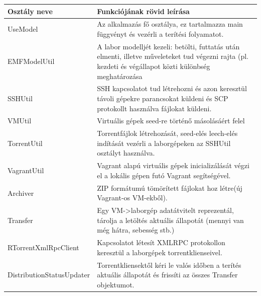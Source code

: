 \begin{center}
	\begin{tabular}{|>{\centering\arraybackslash}m{45mm}|>{\centering\arraybackslash}m{95mm}|}
		\hline
		\textbf{Osztály neve}&\textbf{Funkciójának rövid leírása}\\
		\hline
		\cellcolor{skyblue}UseModel & \cellcolor{skyblue}Az alkalmazás fő osztálya, ez tartalmazza main függvényt és vezérli a terítési folyamatot.\\ 
		\hline
		\cellcolor{skyblue}EMFModelUtil & \cellcolor{skyblue}A labor modelljét kezeli: betölti, futtatás után elmenti, illetve műveleteket tud végezni rajta (pl. kezdeti és végállapot közti különbség meghatározása\\
		\hline
		\cellcolor{seagreen}SSHUtil & \cellcolor{seagreen}SSH kapcsolatot tud létrehozni és azon keresztül távoli gépekre parancsokat küldeni és SCP protokollt használva fájlokat küldeni.\\
		\hline
		\cellcolor{orange}VMUtil & \cellcolor{orange} Virtuális gépek seed-re történő másolásáért felel\\
		\hline
		\cellcolor{orange}TorrentUtil &\cellcolor{orange}Torrentfájlok létrehozását, seed-elés leech-elés indítását vezérli a laborgépeken az SSHUtil osztályt használva. \\
		\hline
		\cellcolor{orange}VagrantUtil &\cellcolor{orange} Vagrant alapú virtuális gépek inicializálását végzi el a lokális gépen futó Vagrant segítségével.\\
		\hline
		\cellcolor{orange}Archiver &\cellcolor{orange} ZIP formátumú tömörített fájlokat hoz létre(új Vagrant-os VM-ekből).\\
		\hline
		\cellcolor{lightred}Transfer &\cellcolor{lightred} Egy VM->laborgép adatátvitelt reprezentál, tárolja a letöltés aktuális állapotát (mennyi van még hátra, sebesség stb.)\\
		\hline
		\cellcolor{lightred}RTorrentXmlRpcClient &\cellcolor{lightred} Kapcsolatot létesít XMLRPC protokollon keresztül a laborgépek torrentklienseivel.\\
		\hline
		\cellcolor{lightred}DistributionStatusUpdater &\cellcolor{lightred} Torrentkliensektől kéri le valós időben a terítés aktuális állapotát és frissíti az összes Transfer objektumot.\\
		\hline
	\end{tabular}
\end{center}

